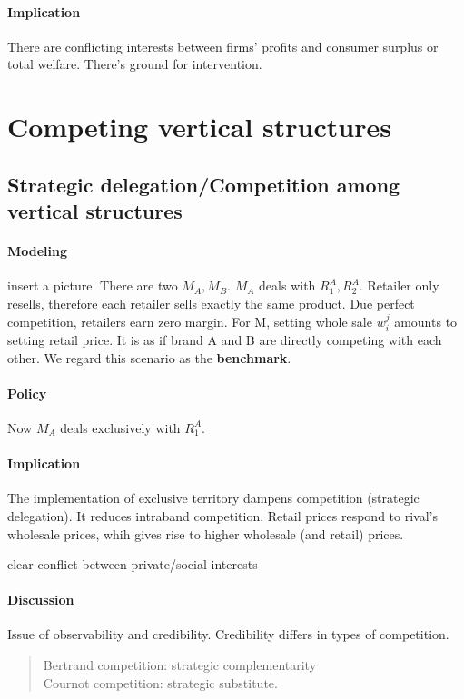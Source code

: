 \paragraph{Implication}
There are conflicting interests between firms’ profits and consumer surplus or total welfare. There's ground for intervention.
\section{Competing vertical structures}
\subsection{Strategic delegation/Competition among vertical structures}
\paragraph{Modeling}
insert a picture.
There are two $M_A, M_B$. $M_A$ deals with $R_1^A, R_2^A$. Retailer only resells, therefore each retailer sells exactly the same product. Due perfect competition, retailers earn zero margin. For M, setting whole sale $w_i^j$ amounts to setting retail price. It is as if brand A and B are directly competing with each other.
We regard this scenario as the \textbf{benchmark}.
\paragraph{Policy} Now $M_A$ deals exclusively with $R_1^A$.
\paragraph{Implication} The implementation of exclusive territory dampens competition (strategic delegation). It reduces intraband competition. Retail prices respond to rival’s wholesale prices, whih gives rise to higher wholesale (and retail) prices.
\begin{remark}
    clear conflict between private/social interests
\end{remark}
\paragraph{Discussion}
Issue of observability and credibility. 
Credibility differs in types of competition.
\begin{quote}
    Bertrand competition: strategic complementarity\\
    Cournot competition: strategic substitute.
\end{quote}
    
